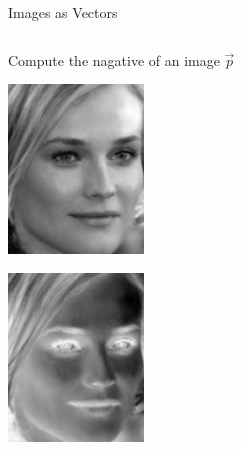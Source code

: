 \documentclass[10pt,aspectratio=169,usenames,dvipsnames,handout]{beamer}
\begin{document}
\begin{frame}[fragile]{Images as Vectors}
\begin{center}
\begin{columns}[T,onlytextwidth]
\begin{block}{Compute the nagative of an image $\vec{p}$}
\begin{minipage}{0.45\textwidth}
			
		\end{minipage}\hfill
		\begin{minipage}{0.2\textwidth}
			\centering\includegraphics[width=0.6\textwidth]{images/vectormatrix/Diane_Kruger}
		\end{minipage}
		\begin{minipage}{0.2\textwidth}
			\centering\includegraphics[width=0.6\textwidth]{images/vectormatrix/Diane_Kruger_negative}
		\end{minipage}
	\end{block}
\end{columns}
\end{center}
\end{frame}
\end{document}

